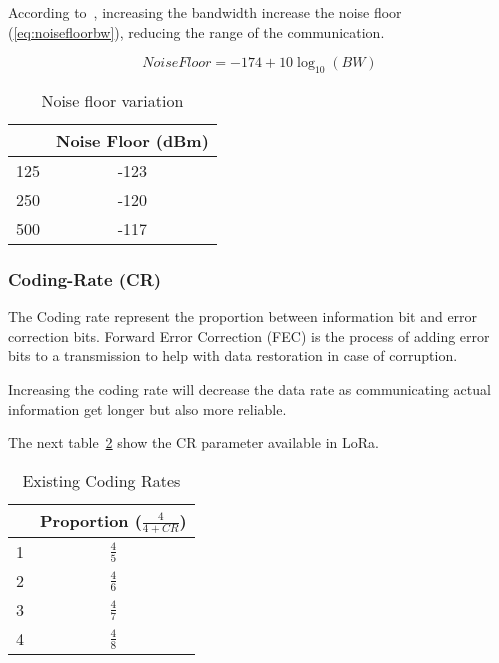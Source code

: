 According to~\cite{semtech:modulationbasics}, increasing the
bandwidth increase the noise floor (\ref{eq:noisefloorbw}), reducing the
range of the communication.

\begin{equation}
 \label{eq:noisefloorbw} 
  Noise Floor = -174 + 10 \log_{10}(BW)
\end{equation}


\begin{table}[h!]
\centering
\begin{tabular}{|c|c|}
\hline
\rowcolor[HTML]{C0C0C0} 
\multicolumn{1}{|c|}{\cellcolor[HTML]{C0C0C0}Bandwidth(kHz)} & Noise Floor (dBm) \\ \hline
125                                                          & -123              \\ \hline
250                                                          & -120              \\ \hline
500                                                          & -117              \\ \hline
\end{tabular}
\caption{Noise floor variation\label{table:bw}}
\end{table}


\subsubsection{Coding-Rate (CR)}

The Coding rate represent the proportion between information bit and error
correction bits. 
Forward Error Correction (FEC) is the process of adding error bits to a
transmission to help with data restoration in case of corruption.

Increasing the coding rate will decrease the data rate as communicating actual
information get longer but also more reliable.

The next table~\ref{table:cr} show the CR parameter available in LoRa.

\begin{table}[h!]
\centering
\begin{tabular}{|c|c|}
\hline
\rowcolor[HTML]{C0C0C0} 
  \multicolumn{1}{|c|}{\cellcolor[HTML]{C0C0C0}CR} & Proportion ($\frac{4}{4 + CR}$) \\ \hline
1                                                & $\frac{4}{5}$\\ \hline
2                                                & $\frac{4}{6}$\\ \hline
3                                                & $\frac{4}{7}$\\ \hline
4                                                & $\frac{4}{8}$\\ \hline
\end{tabular}
  \caption{Existing Coding Rates\label{table:cr}}
\end{table}

